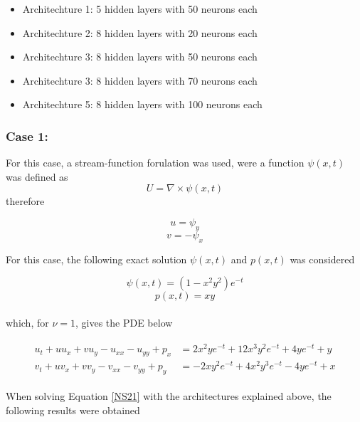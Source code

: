 \documentclass[12pt,letterpaper]{article}
\begin{document}
\begin{itemize}
  \item Architechture 1: 5 hidden layers with 50 neurons each
  \item Architechture 2: 8 hidden layers with 20 neurons each
  \item Architechture 3: 8 hidden layers with 50 neurons each
  \item Architechture 3: 8 hidden layers with 70 neurons each
  \item Architechture 5: 8 hidden layers with 100 neurons each
\end{itemize}

\subsubsection*{Case 1:}

For this case, a stream-function forulation was used, were a function $\psi(x,t)$ was defined as $$U = \nabla\times\psi(x,t)$$ therefore

$$u = \psi_y$$
$$v = -\psi_x$$

For this case, the following exact solution $\psi(x,t)$ and $p(x,t)$ was considered

$$\psi(x,t) = (1-x^2y^2)e^{-t}$$
$$p(x,t) = xy$$\\

which, for $\nu=1$, gives the PDE below

\begin{align}
  \label{NS21}
  \begin{split}
    u_t + u u_x + vu_y - u_{xx} - u_{yy} + p_x & = 2x^2ye^{-t} + 12 x^3y^2 e^{-t} + 4ye^{-t} + y \\
    v_t + u v_x + v v_y - v_{xx} - v_{yy} + p_y &= - 2xy^2e^{-t} + 4 x^2y^3 e^{-t} - 4ye^{-t} + x
  \end{split}
\end{align}
 

When solving Equation \ref{NS21} with the architectures explained above, the following results were obtained
\end{document}
